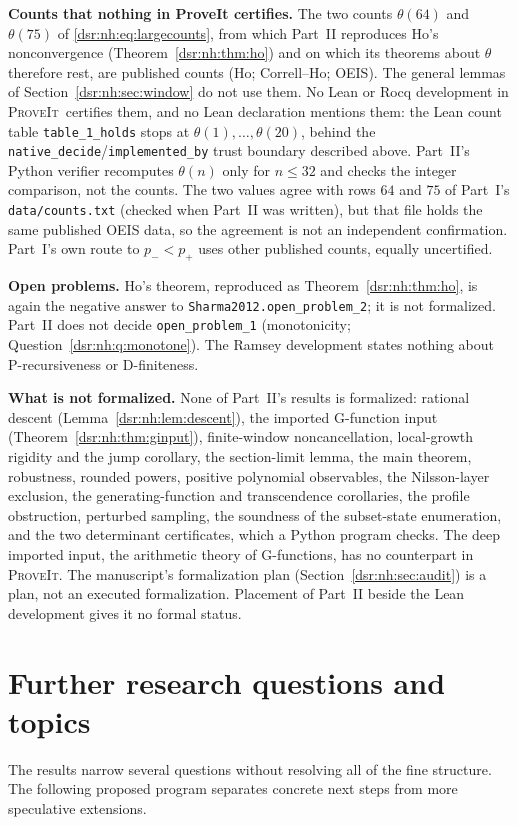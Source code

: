\documentclass[11pt,a4paper]{article}
\numberwithin{equation}{section}
\theoremstyle{definition}
\theoremstyle{remark}
\newcommand{\repo}{\textsc{ProveIt}}
\newcommand{\lean}[1]{\nolinkurl{#1}}
\theoremstyle{definition}
\theoremstyle{plain}
\begin{document}
\medskip\noindent\textbf{Counts that nothing in ProveIt certifies.}
The two counts $\theta(64)$ and $\theta(75)$ of
\eqref{dsr:nh:eq:largecounts}, from which Part~II reproduces Ho's
nonconvergence (Theorem~\ref{dsr:nh:thm:ho}) and on which its theorems
about $\theta$ therefore rest, are published counts (Ho; Correll--Ho;
OEIS). The general lemmas of Section~\ref{dsr:nh:sec:window} do not use
them. No Lean or Rocq development in \repo\
certifies them, and no Lean declaration mentions them: the Lean count table
\lean{table_1_holds} stops at $\theta(1),\ldots,\theta(20)$, behind the
\lean{native_decide}/\lean{implemented_by} trust boundary described above.
Part~II's Python verifier recomputes $\theta(n)$ only for $n\le32$ and
checks the integer comparison, not the counts. The two values agree with
rows $64$ and $75$ of Part~I's \lean{data/counts.txt} (checked when Part~II
was written), but that file holds the same published OEIS data, so the
agreement is not an independent confirmation. Part~I's own route to
$p_-<p_+$ uses other published counts, equally uncertified.

\medskip\noindent\textbf{Open problems.} Ho's theorem, reproduced as
Theorem~\ref{dsr:nh:thm:ho}, is again the negative answer to
\lean{Sharma2012.open_problem_2}; it is not formalized. Part~II does not
decide \lean{open_problem_1} (monotonicity;
Question~\ref{dsr:nh:q:monotone}). The Ramsey development states nothing
about P-recursiveness or D-finiteness.

\medskip\noindent\textbf{What is not formalized.} None of Part~II's results
is formalized: rational descent (Lemma~\ref{dsr:nh:lem:descent}), the
imported G-function input (Theorem~\ref{dsr:nh:thm:ginput}), finite-window
noncancellation, local-growth rigidity and the jump corollary, the
section-limit lemma, the main theorem, robustness, rounded powers,
positive polynomial observables, the Nilsson-layer exclusion, the
generating-function and transcendence corollaries, the profile obstruction,
perturbed sampling, the soundness of the subset-state enumeration, and the
two determinant certificates, which a Python program checks. The deep
imported input, the arithmetic theory of G-functions, has no counterpart in
\repo. The manuscript's formalization plan
(Section~\ref{dsr:nh:sec:audit}) is a plan, not an executed
formalization. Placement of Part~II beside the Lean development gives it
no formal status.

\section{Further research questions and topics}
\label{dsr:sec:questions}
The results narrow several questions without resolving all of the fine
structure. The following proposed program separates concrete next steps from
more speculative extensions.
\end{document}
